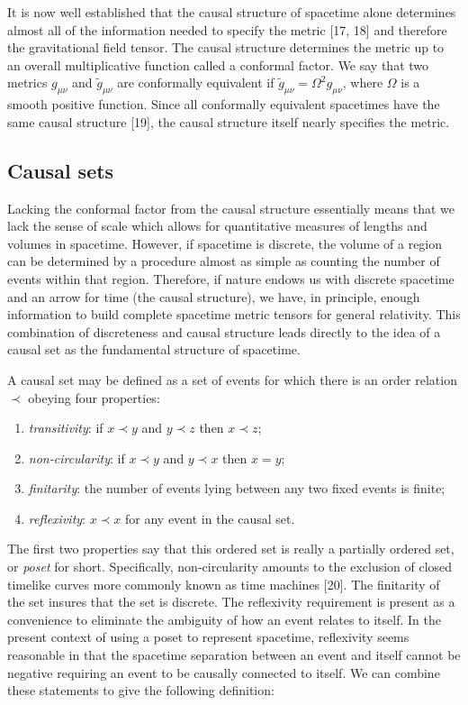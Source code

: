 It is now well established that the causal structure of spacetime alone
determines almost all of the information needed to specify the metric [17,
18] and therefore the gravitational field tensor. The causal structure
determines the metric up to an overall multiplicative function called a
conformal factor. We say that two metrics $g_{\mu \nu }$ and $\widetilde{g}%
_{\mu \nu }$ are conformally equivalent if $\widetilde{g}_{\mu \nu }=\Omega
^2g_{\mu \nu }$, where $\Omega $ is a smooth positive function. Since all
conformally equivalent spacetimes have the same causal structure [19], the
causal structure itself nearly specifies the metric.

\subsection{Causal sets}

Lacking the conformal factor from the causal structure essentially means
that we lack the sense of scale which allows for quantitative measures of
lengths and volumes in spacetime. However, if spacetime is discrete, the
volume of a region can be determined by a procedure almost as simple as
counting the number of events within that region. Therefore, if nature
endows us with discrete spacetime and an arrow for time (the causal
structure), we have, in principle, enough information to build complete
spacetime metric tensors for general relativity. This combination of
discreteness and causal structure leads directly to the idea of a causal set
as the fundamental structure of spacetime.

A causal set may be defined as a set of events for which there is an order
relation $\prec $ obeying four properties:

\begin{enumerate}
\item  {\it transitivity}: if $x\prec y$ and $y\prec z$ then $x\prec z$;

\item  {\it non-circularity}: if $x\prec y$ and $y\prec x$ then $x=y$;

\item  {\it finitarity}: the number of events lying between any two fixed
events is finite;

\item  {\it reflexivity}: $x\prec x$ for any event in the causal set.
\end{enumerate}

The first two properties say that this ordered set is really a partially
ordered set, or {\it poset} for short. Specifically, non-circularity amounts
to the exclusion of closed timelike curves more commonly known as time
machines [20]. The finitarity of the set insures that the set is discrete.
The reflexivity requirement is present as a convenience to eliminate the
ambiguity of how an event relates to itself. In the present context of using
a poset to represent spacetime, reflexivity seems reasonable in that the
spacetime separation between an event and itself cannot be negative
requiring an event to be causally connected to itself. We can combine these
statements to give the following definition:


